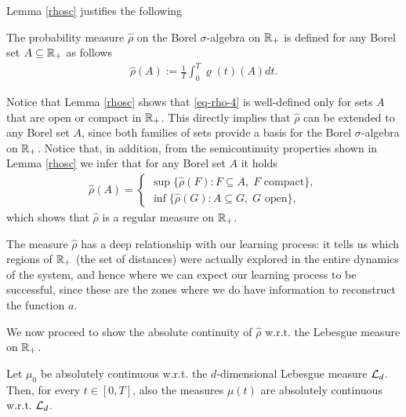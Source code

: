 Lemma \ref{rhosc} justifies the following
\begin{definition}
The probability measure $\widehat \rho$ on the Borel $\sigma$-algebra on $\mathbb{R}_+$ is defined for any Borel set $A \subseteq \mathbb{R}_+$ as follows
\begin{align}\label{eq-rho-4}
	\widehat \rho(A):=\frac{1}{T}\int_0^T\varrho(t)(A)dt.
\end{align}
\end{definition}
Notice that Lemma \ref{rhosc} shows that \eqref{eq-rho-4} is well-defined only for sets $A$ that are open or compact in $\mathbb{R}_+$. This directly implies that $\widehat \rho$ can be extended to any Borel set $A$, since both families of sets provide a basis for the Borel $\sigma$-algebra on $\mathbb{R}_+$. Notice that, in addition, from the semicontinuity properties shown in Lemma \ref{rhosc} we infer that for any Borel set $A$ it holds
\begin{align*}
	\widehat \rho(A) = \begin{cases}
	\sup\{\widehat \rho(F) : F \subseteq A, \;F \text{ compact}\},\\
	\inf\{\widehat \rho(G) : A \subseteq G, \;G \text{ open}\},
	\end{cases}
\end{align*}
which shows that $\widehat \rho$ is a regular measure on $\mathbb{R}_+$.

\vspace{0.3cm}

The measure $\widehat  \rho$ has a deep relationship with our learning process: it tells us which regions of $\mathbb{R}_+$ (the set of distances) were actually explored in the entire dynamics of the system, and hence where we can expect our learning process to be successful, since these are the zones where we do have information to reconstruct the function $a$.

We now proceed to show the absolute continuity of $ \widehat  \rho$ w.r.t. the Lebesgue measure on $\mathbb{R}_+$.

\begin{lemma}\label{lemma-AC-1}
	Let $\mu_0$ be absolutely continuous w.r.t. the $d$-dimensional Lebesgue measure $\mathcal{L}_d$. Then, for every
	$t\in [0,T]$, also the measures $\mu(t)$ are absolutely continuous w.r.t. $\mathcal{L}_d$.
\end{lemma}

